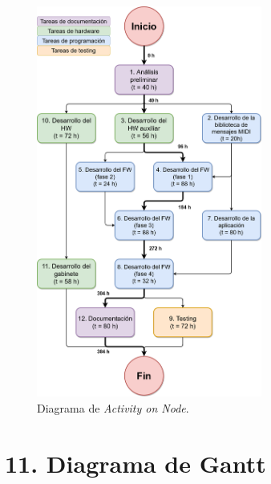 \documentclass[
11pt, %
]{charter}
\begin{document}
\begin{figure}[htpb]
\centering 
\includegraphics[width=0.66\textwidth]{./Figuras/gdp-aon.png}
\caption{Diagrama de \textit{Activity on Node}.}
\label{fig:AoN}
\end{figure}


\section{11. Diagrama de Gantt}
\label{sec:gantt}
\end{document}
